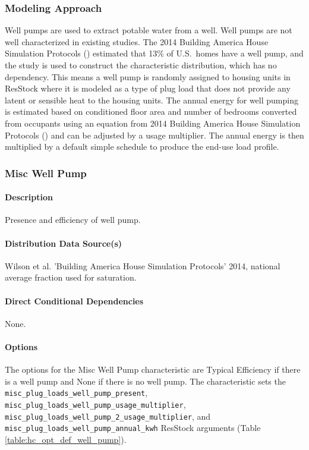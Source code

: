 \subsubsection{Modeling Approach}
Well pumps are used to extract potable water from a well. Well pumps are not well characterized in existing studies. The 2014 Building America House Simulation Protocols (\cite{Wilson2014}) estimated that 13\% of U.S.~homes have a well pump, and the study is used to construct the characteristic distribution, which has no dependency. This means a well pump is randomly assigned to housing units in ResStock where it is modeled as a type of plug load that does not provide any latent or sensible heat to the housing units. The annual energy for well pumping is estimated based on conditioned floor area and number of bedrooms converted from occupants using an equation from 2014 Building America House Simulation Protocols (\cite{Wilson2014}) and can be adjusted by a usage multiplier. The annual energy is then multiplied by a default simple schedule to produce the end-use load profile.

\subsubsection{Misc Well Pump}
\paragraph{Description}
Presence and efficiency of well pump.

\paragraph{Distribution Data Source(s)}
Wilson et al. 'Building America House Simulation Protocols' 2014, national average fraction used for saturation.

\paragraph{Direct Conditional Dependencies}
None.

\paragraph{Options}
The options for the Misc Well Pump characteristic are Typical Efficiency if there is a well pump and None if there is no well pump. The characteristic sets the \texttt{misc\_plug\_loads\_well\_pump\_present}, \texttt{misc\_plug\_loads\_well\_pump\_usage\_multiplier}, \texttt{misc\_plug\_loads\_well\_pump\_2\_usage\_multiplier}, and \texttt{misc\_plug\_loads\_well\_pump\_annual\_kwh} ResStock arguments (Table \ref{table:hc_opt_def_well_pump}). 


